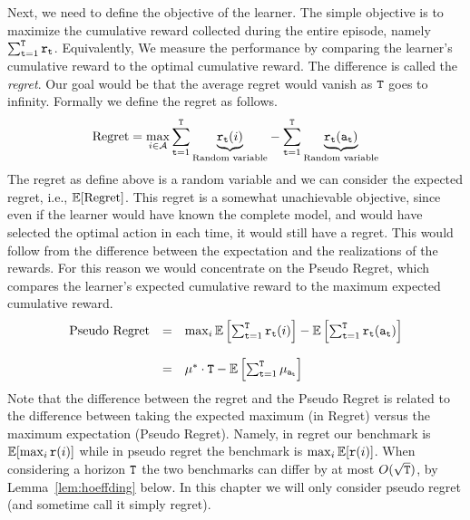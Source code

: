 Next, we need to define the objective of the learner. The simple objective is to maximize the cumulative reward collected during the entire episode, namely $\sum_{{\tt t}=1}^{\tt T} {\tt r}_{\tt t}$. Equivalently, We measure the performance by comparing the learner's cumulative reward to the optimal cumulative reward. The difference is called the \emph{regret}. Our goal would be that the average regret would vanish as ${\tt T}$ goes to infinity.
Formally we define the regret as follows.
\[
\text{Regret}=\max_{i\in \mathcal{A}}{\displaystyle
\sum_{{\tt t}=1}^{{\tt T}}\underbrace{{\tt r}_{{\tt t}}(i)}_{\text{Random variable}}}-{\displaystyle
\sum_{{\tt t}=1}^{{\tt T}}\underbrace{{\tt r}_{{\tt t}}({\tt a}_{{\tt t}})}_{\text{Random variable}}}
\]
The regret as define above is a random variable and we can consider the expected regret, i.e., $\mathbb{E}[\text{Regret}]$. This regret is a somewhat unachievable objective, since even if the learner would have known the complete model, and would have selected the optimal action in each time, it would still have a regret. This would follow from the difference between the expectation and the realizations of the rewards.
For this reason we would concentrate on the Pseudo Regret, which compares the learner's expected cumulative reward to the maximum expected cumulative reward. 
\[
\begin{array}{ccl}
\text{Pseudo Regret} & = & \max_{i}\mathbb{E}\left[ \sum_{{\tt t}= 1}^{{\tt T}}{\tt r}_{{\tt t}}(i)\right]-\mathbb{E}\left[ \sum_{{\tt t}=1}^{{\tt T}}{\tt r}_{{\tt t}}({\tt a}_{{\tt t}})\right]\\
\\
 & = & \mu^{*}\cdot {\tt T}- \mathbb{E}\left[\sum_{{\tt t}=1}^{{\tt T}}\mu_{{\tt a}_{{\tt t}}}\right]
\end{array}
\]
Note that the difference between the regret and the Pseudo Regret is related to the difference between taking the expected maximum (in Regret) versus the maximum expectation (Pseudo Regret). Namely, in regret our benchmark is $\mathbb{E}[\max_i {\tt r}(i)]$ while in pseudo regret the benchmark is $\max_i \mathbb{E}[{\tt r}(i)]$. When considering a horizon ${\tt T}$ the two benchmarks can differ by at most $O(\sqrt{{\tt T}})$, by Lemma~\ref{lem:hoeffding} below.
%
In this chapter we will only consider pseudo regret (and sometime call it simply regret). 


